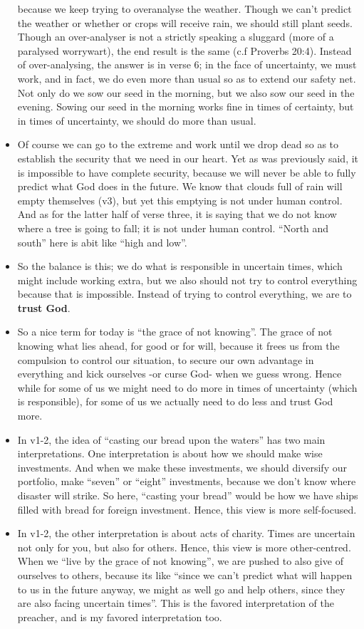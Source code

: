 \begin{itemize}
{  because we keep trying to overanalyse the weather.  Though we can't predict
  the weather or whether or crops will receive rain, we should still plant
  seeds.  Though an over-analyser is not a strictly speaking a sluggard (more
  of a paralysed worrywart), the end result is the same (c.f Proverbs 20:4).
  Instead of over-analysing, the answer is in verse 6; in the face of
  uncertainty, we must work, and in fact, we do even more than usual so as to
  extend our safety net.  Not only do we sow our seed in the morning, but we
  also sow our seed in the evening.  Sowing our seed in the morning works
  fine in times of certainty, but in times of uncertainty, we should do more
  than usual.}
  \item{Of course we can go to the extreme and work until we drop dead so as
  to establish the security that we need in our heart.  Yet as was previously
  said, it is impossible to have complete security, because we will never be
  able to fully predict what God does in the future.  We know that clouds
  full of rain will empty themselves (v3), but yet this emptying is not under
  human control.  And as for the latter half of verse three, it is saying
  that we do not know where a tree is going to fall; it is not under human
  control.  ``North and south'' here is abit like ``high and low''.}
  \item{So the balance is this; we do what is responsible in uncertain times,
  which might include working extra, but we also should not try to control
  everything because that is impossible.  Instead of trying to control
  everything, we are to \textbf{trust God}.}
  \item{So a nice term for today is ``the grace of not knowing''.  The grace
  of not knowing what lies ahead, for good or for will, because it frees us
  from the compulsion to control our situation, to secure our own advantage
  in everything and kick ourselves -or curse God- when we guess wrong.  Hence
  while for some of us we might need to do more in times of uncertainty
  (which is responsible), for some of us we actually need to do less and
  trust God more.}
  \item{In v1-2, the idea of ``casting our bread upon the waters'' has two
  main interpretations.  One interpretation is about how we should make wise
  investments.  And when we make these investments, we should diversify our
  portfolio, make ``seven'' or ``eight'' investments, because we don't know
  where disaster will strike.  So here, ``casting your bread'' would be how
  we have ships filled with bread for foreign investment.  Hence, this view
  is more self-focused.}
  \item{In v1-2, the other interpretation is about acts of charity.  Times
  are uncertain not only for you, but also for others.  Hence, this view is
  more other-centred.  When we ``live by the grace of not knowing'', we are
  pushed to also give of ourselves to others, because its like ``since we
  can't predict what will happen to us in the future anyway, we might as well
  go and help others, since they are also facing uncertain times''.  This is
  the favored interpretation of the preacher, and is my favored
  interpretation too.}
\end{itemize}